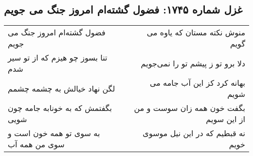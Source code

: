 \begin{center}
\section*{غزل شماره ۱۷۴۵: فضول گشته‌ام امروز جنگ می جویم}
\label{sec:1745}
\begin{longtable}{l p{0.5cm} r}
فضول گشته‌ام امروز جنگ می جویم
&&
منوش نکته مستان که یاوه می گویم
\\
تنا بسوز چو هیزم که از تو سیر شدم
&&
دلا برو تو ز پیشم تو را نمی‌جویم
\\
لگن نهاد خیالش به چشمه چشمم
&&
بهانه کرد کز این آب جامه می شویم
\\
بگفتمش که به خونابه جامه چون شویی
&&
بگفت خون همه زان سوست و من از این سویم
\\
به سوی تو همه خون است و سوی من همه آب
&&
نه قبطیم که در این نیل موسوی خویم
\\
\end{longtable}
\end{center}
